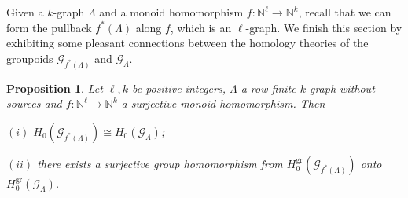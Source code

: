 \documentclass[12pt]{amsart}
\newtheorem{prop}[thm]{Proposition}
\theoremstyle{definition}
\theoremstyle{remark}
\newcommand{\gr}{\operatorname{gr}}
\begin{document}
Given a $k$-graph $\Lambda$ and a monoid homomorphism $f:\mathbb{N}^\ell\longrightarrow \mathbb{N}^k$, recall that we can form the pullback $f^*(\Lambda)$ along $f$, which is an $\ell$-graph. We finish this section by exhibiting some pleasant connections between the homology theories of the groupoids $\mathcal{G}_{f^*(\Lambda)}$ and $\mathcal{G}_\Lambda$. 

\begin{prop}\label{pro homology of pullback graph groupoid}
Let $\ell,k$ be positive integers, $\Lambda$ a row-finite $k$-graph without sources and $f:\mathbb{N}^\ell\longrightarrow \mathbb{N}^k$ a surjective monoid homomorphism. Then 

$(i)$ $H_0(\mathcal{G}_{f^*(\Lambda)})\cong H_0(\mathcal{G}_\Lambda)$;

$(ii)$ there exists a surjective group homomorphism from $H_0^{\gr}(\mathcal{G}_{f^*(\Lambda)})$ onto $H_0^{\gr}(\mathcal{G}_\Lambda)$. 
\end{prop}
\end{document}
